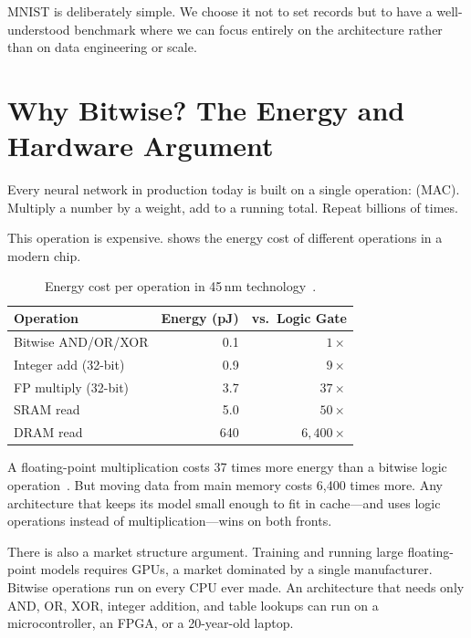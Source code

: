 MNIST is deliberately simple. We choose it not to set records but to
have a well-understood benchmark where we can focus entirely on the
architecture rather than on data engineering or scale.


\section{Why Bitwise? The Energy and Hardware Argument}
\label{sec:why-bitwise}

Every neural network in production today is built on a single
operation:  (MAC). Multiply a number by
a weight, add to a running total. Repeat billions of times.

This operation is expensive.  shows the energy
cost of different operations in a modern chip.

\begin{table}[htbp]
\centering
\caption{Energy cost per operation in 45\,nm technology~\cite{horowitz2014energy}.}
\label{tab:energy-cost}
\begin{tabular}{@{}lrr@{}}
  \toprule
  \textbf{Operation} & \textbf{Energy (pJ)} & \textbf{vs.\ Logic Gate} \\
  \midrule
  Bitwise AND/OR/XOR  & 0.1  & $1\times$ \\
  Integer add (32-bit) & 0.9  & $9\times$ \\
  FP multiply (32-bit) & 3.7  & $37\times$ \\
  SRAM read            & 5.0  & $50\times$ \\
  DRAM read            & 640  & $6{,}400\times$ \\
  \bottomrule
\end{tabular}
\end{table}

\begin{keyinsight}
A floating-point multiplication costs 37 times more energy than a
bitwise logic operation~\cite{horowitz2014energy}. But moving data from main memory costs
6,400 times more. Any architecture that keeps its model small enough
to fit in cache---and uses logic operations instead of
multiplication---wins on both fronts.
\end{keyinsight}

There is also a market structure argument. Training and running large
floating-point models requires GPUs, a market dominated by a single
manufacturer. Bitwise operations run on every CPU ever made. An
architecture that needs only AND, OR, XOR, integer addition, and table
lookups can run on a microcontroller, an FPGA, or a 20-year-old laptop.


